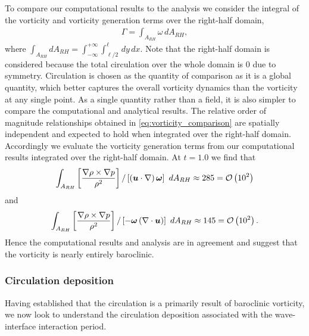 To compare our computational results to the analysis we consider the
integral of the vorticity and vorticity generation terms over the
right-half domain,
\begin{align}
  \Gamma = \int_{A_{RH}} \omega \,dA_{RH},
\end{align}
where
$\int_{A_{RH}} dA_{RH} =
\int_{-\infty}^{+\infty}\int_{\ell/2}^{\ell} \,dy\, dx$. Note
that the right-half domain is considered because the total circulation
over the whole domain is $0$ due to symmetry. Circulation is chosen as
the quantity of comparison as it is a global quantity, which better
captures the overall vorticity dynamics than the vorticity at any
single point. As a single quantity rather than a field, it is also
simpler to compare the computational and analytical results. The
relative order of magnitude relationships obtained in
\eqref{eq:vorticity_comparison} are spatially independent and expected
to hold when integrated over the right-half domain. Accordingly we
evaluate the vorticity generation terms from our computational results
integrated over the right-half domain. At $t=1.0$ we find that %
$$ \int_{A_{RH}} \left[\frac{\nabla\rho\times\nabla p}{\rho^2}\right] / \left[\left(\boldsymbol{u}\cdot\nabla\right)\boldsymbol{\omega}\right]\,\,dA_{RH}\approx 285=\mathcal{O}\left(10^2\right)$$
and
$$ \int_{A_{RH}} \left[\frac{\nabla\rho\times\nabla p}{\rho^2}\right] / \left[-\boldsymbol{\omega}\left(\nabla\cdot\boldsymbol{u}\right)\right]\,\,dA_{RH} \approx 145=\mathcal{O}\left(10^2\right).$$%
%
Hence the computational results and analysis are in agreement and suggest
that the vorticity is nearly entirely baroclinic.
% 
% 
\subsubsection{Circulation deposition}
Having established that the circulation is a primarily result of
baroclinic vorticity, we now look to understand the circulation
deposition associated with the wave-interface interaction period.

